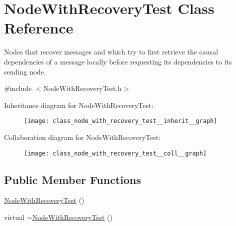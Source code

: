 \hypertarget{class_node_with_recovery_test}{}\section{Node\+With\+Recovery\+Test Class Reference}
\label{class_node_with_recovery_test}


Nodes that recover messages and which try to first retrieve the causal dependencies of a message locally before requesting its dependencies to its sending node.  




{\ttfamily \#include $<$Node\+With\+Recovery\+Test.\+h$>$}



Inheritance diagram for Node\+With\+Recovery\+Test\+:
\nopagebreak
\begin{figure}[H]
\begin{center}
\leavevmode
\texttt{[image: class\_node\_with\_recovery\_test\_\_inherit\_\_graph]}
\end{center}
\end{figure}


Collaboration diagram for Node\+With\+Recovery\+Test\+:
\nopagebreak
\begin{figure}[H]
\begin{center}
\leavevmode
\texttt{[image: class\_node\_with\_recovery\_test\_\_coll\_\_graph]}
\end{center}
\end{figure}
\subsection*{Public Member Functions}
\begin{DoxyCompactItemize}
\item 
\hyperlink{class_node_with_recovery_test_ae8676a479a3ad761eb6cd5069575f51f}{Node\+With\+Recovery\+Test} ()
\item 
virtual \hyperlink{class_node_with_recovery_test_a91ac9cad83523696aee1a5c5718a62af}{$\sim$\+Node\+With\+Recovery\+Test} ()
\end{DoxyCompactItemize}
